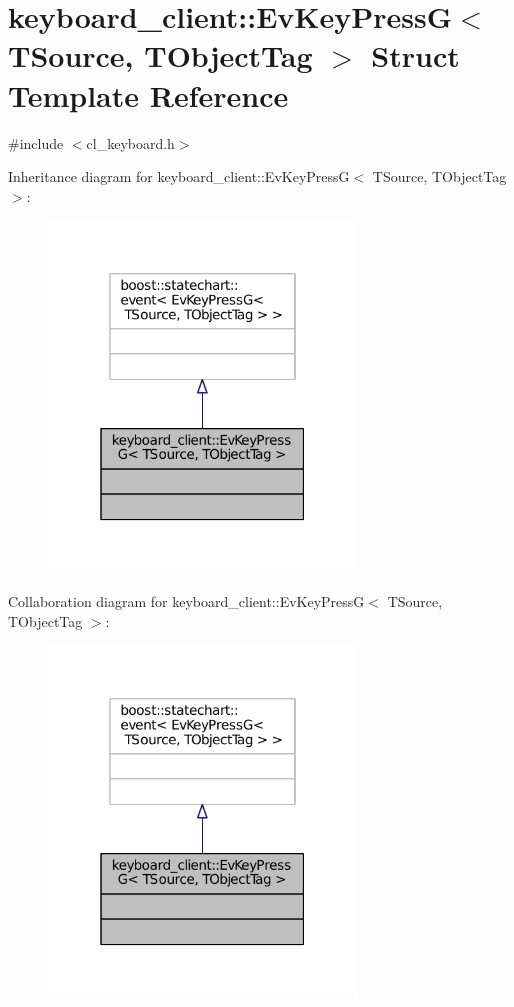 \hypertarget{structkeyboard__client_1_1EvKeyPressG}{}\section{keyboard\+\_\+client\+:\+:Ev\+Key\+PressG$<$ T\+Source, T\+Object\+Tag $>$ Struct Template Reference}
\label{structkeyboard__client_1_1EvKeyPressG}


{\ttfamily \#include $<$cl\+\_\+keyboard.\+h$>$}



Inheritance diagram for keyboard\+\_\+client\+:\+:Ev\+Key\+PressG$<$ T\+Source, T\+Object\+Tag $>$\+:
\nopagebreak
\begin{figure}[H]
\begin{center}
\leavevmode
\includegraphics[width=232pt]{structkeyboard__client_1_1EvKeyPressG__inherit__graph}
\end{center}
\end{figure}


Collaboration diagram for keyboard\+\_\+client\+:\+:Ev\+Key\+PressG$<$ T\+Source, T\+Object\+Tag $>$\+:
\nopagebreak
\begin{figure}[H]
\begin{center}
\leavevmode
\includegraphics[width=232pt]{structkeyboard__client_1_1EvKeyPressG__coll__graph}
\end{center}
\end{figure}


